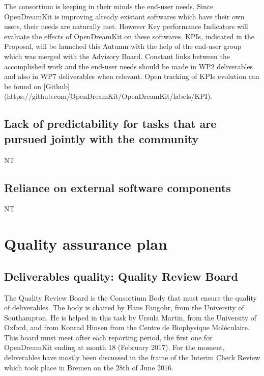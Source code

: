 \documentclass{../../Proposal/LaTeX-proposal/deliverablereport}
\begin{document}
The consortium is keeping in their minds the end-user needs. Since OpenDreamKit is improving already existant softwares which have their own users, their needs are naturally met. However Key performance Indicators will evaluate the effects of OpenDreamKit on these softwares. KPIs, indicated in the Proposal, will be launched this Autumn with the help of the end-user group which was merged with the Advisory Board. Constant links between the accomplished work and the end-user needs should be made in WP2 deliverables and also in WP7 deliverables when relevant.
Open tracking of KPIs evolution can be found on [Github](https://github.com/OpenDreamKit/OpenDreamKit/labels/KPI).

\subsection{Lack of predictability for tasks that are pursued jointly with the community}
NT
\subsection{Reliance on external software components}
NT

\section{Quality assurance plan}

\subsection{Deliverables quality: Quality Review Board}


The Quality Review Board is the Consortium Body that must ensure the quality of deliverables.
The body is chaired by Hans Fangohr, from the University of Southampton. He is helped in this task by Ursula Martin, from the University of Oxford, and from Konrad Hinsen from the Centre de Biophysique Moléculaire. This board must meet after each reporting period, the first one for OpenDreamKit ending at month 18 (February 2017). 
For the moment, deliverables have mostly been discussed in the frame of the Interim Check Review which took place in Bremen on the 28th of June 2016.
\end{document}
